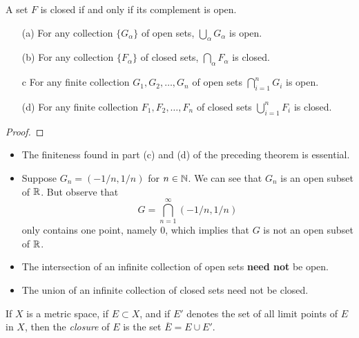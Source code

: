 \documentclass[11pt,a4paper]{book}
\begin{document}
\begin{corollary}
   A set \( F  \) is closed if and only if its complement is open. 
\end{corollary}

\begin{theorem}[ ]\label{Theorem 2.24}
    \begin{enumerate}
        \item[(a)] For any collection \( \{ {G}_{\alpha} \}  \) of open sets, \( \bigcup_{ \alpha  }^{  }  {G}_{\alpha} \) is open.
        \item[(b)] For any collection \( \{ {F}_{\alpha} \} \) of closed sets, \( \bigcap_{  \alpha  }^{  }  {F}_{\alpha} \) is closed.
        \item[c] For any finite collection \( {G}_{1}, {G}_{2}, \dots, {G}_{n} \) of open sets \( \bigcap_{ i=1  }^{ n  } {G}_{i}   \) is open.
        \item[(d)] For any finite collection \( {F}_{1}, {F}_{2}, \dots, {F}_{n} \) of closed sets \( \bigcup_{ i=1  }^{ n }  {F}_{i} \) is closed.
    \end{enumerate}
\end{theorem}
\begin{proof}

\end{proof}

\begin{eg}
   \begin{itemize}
       \item The finiteness found in part (c) and (d) of the preceding theorem is essential.
        \item Suppose \( {G}_{n} = (-1/n, 1/n) \) for \( n \in \mathbb{N} \). We can see that \( {G}_{n} \) is an open subset of \( \mathbb{R}  \). But observe that 
            \[  G = \bigcap_{ n= 1  }^{  \infty   } (-1/n, 1/n)  \]
            only contains one point, namely \( 0  \), which implies that \( G  \) is not an open subset of \( \mathbb{R}  \).
   \end{itemize} 
\end{eg}

\begin{itemize}
    \item The intersection of an infinite collection of open sets \textbf{need not} be open.
    \item The union of an infinite collection of closed sets need not be closed.
\end{itemize}

\begin{definition}[Closure]
    If \( X  \) is a metric space, if \( E \subset X  \), and if \( E' \) denotes the set of all limit points of \( E  \) in \( X  \), then the \textit{closure} of \( E  \) is the set \( \overline{E} = E \cup E' \). 
\end{definition}
\end{document}
